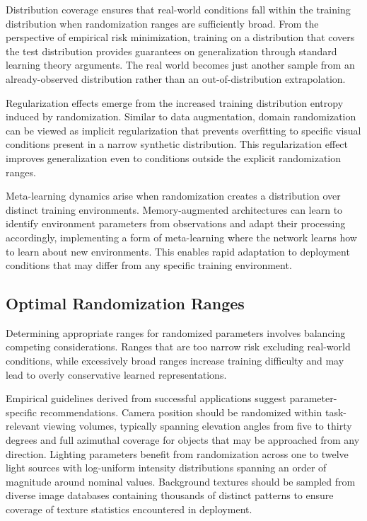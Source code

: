 Distribution coverage ensures that real-world conditions fall within the training distribution when randomization ranges are sufficiently broad. From the perspective of empirical risk minimization, training on a distribution that covers the test distribution provides guarantees on generalization through standard learning theory arguments. The real world becomes just another sample from an already-observed distribution rather than an out-of-distribution extrapolation.

Regularization effects emerge from the increased training distribution entropy induced by randomization. Similar to data augmentation, domain randomization can be viewed as implicit regularization that prevents overfitting to specific visual conditions present in a narrow synthetic distribution. This regularization effect improves generalization even to conditions outside the explicit randomization ranges.

Meta-learning dynamics arise when randomization creates a distribution over distinct training environments. Memory-augmented architectures can learn to identify environment parameters from observations and adapt their processing accordingly, implementing a form of meta-learning where the network learns how to learn about new environments. This enables rapid adaptation to deployment conditions that may differ from any specific training environment.

\subsection{Optimal Randomization Ranges}

Determining appropriate ranges for randomized parameters involves balancing competing considerations. Ranges that are too narrow risk excluding real-world conditions, while excessively broad ranges increase training difficulty and may lead to overly conservative learned representations.

Empirical guidelines derived from successful applications suggest parameter-specific recommendations. Camera position should be randomized within task-relevant viewing volumes, typically spanning elevation angles from five to thirty degrees and full azimuthal coverage for objects that may be approached from any direction. Lighting parameters benefit from randomization across one to twelve light sources with log-uniform intensity distributions spanning an order of magnitude around nominal values. Background textures should be sampled from diverse image databases containing thousands of distinct patterns to ensure coverage of texture statistics encountered in deployment.

